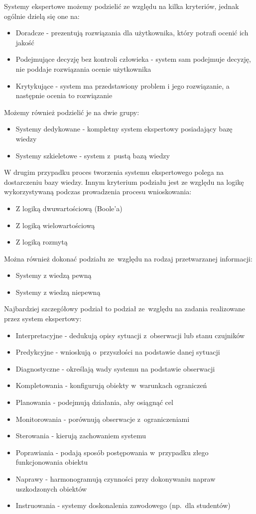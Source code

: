 Systemy ekspertowe możemy podzielić ze względu na kilka kryteriów, jednak ogólnie dzielą się one na:
\begin{itemize}
	\item Doradcze - prezentują rozwiązania dla użytkownika, który potrafi ocenić ich jakość
	\item Podejmujące decyzję bez kontroli człowieka - system sam podejmuje decyzję, nie poddaje rozwiązania ocenie użytkownika
	\item Krytykujące - system ma przedstawiony problem i jego rozwiązanie, a następnie ocenia to rozwiązanie
\end{itemize}
Możemy również podzielić je na dwie grupy:
\begin{itemize}
	\item Systemy dedykowane - kompletny system ekspertowy posiadający bazę wiedzy
	\item Systemy szkieletowe - system z~pustą bazą wiedzy
\end{itemize}
W drugim przypadku proces tworzenia systemu ekspertowego polega na dostarczeniu bazy wiedzy.
Innym kryterium podziału jest ze względu na logikę wykorzystywaną podczas prowadzenia procesu wnioskowania:
\begin{itemize}
	\item Z logiką dwuwartościową (Boole'a)
	\item Z logiką wielowartościową
	\item Z logiką rozmytą
\end{itemize}
Można również dokonać podziału ze~względu na rodzaj przetwarzanej informacji:
\begin{itemize}
	\item Systemy z wiedzą pewną
	\item Systemy z wiedzą niepewną
\end{itemize}
Najbardziej szczegółowy podział to podział ze~względu na zadania realizowane przez system ekspertowy:
\begin{itemize}
	\item Interpretacyjne - dedukują opisy sytuacji z~obserwacji lub stanu czujników
	\item Predykcyjne - wnioskują o~przyszłości na podstawie danej sytuacji
	\item Diagnostyczne - określają wady systemu na podstawie obserwacji
	\item Kompletowania - konfigurują obiekty w~warunkach ograniczeń
	\item Planowania - podejmują działania, aby osiągnąć cel
	\item Monitorowania - porównują obserwacje z~ograniczeniami
	\item Sterowania - kierują zachowaniem systemu
	\item Poprawiania - podają sposób postępowania w~przypadku złego funkcjonowania obiektu
	\item Naprawy - harmonogramują czynności przy dokonywaniu napraw uszkodzonych obiektów
	\item Instruowania - systemy doskonalenia zawodowego (np.~dla studentów)
\end{itemize}

